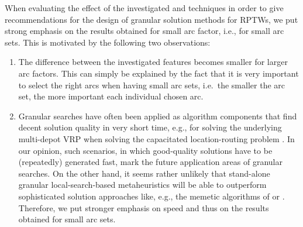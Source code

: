 \documentclass[11pt,a4paper,fleqn]{article}
\begin{document}
When evaluating the effect of the investigated \sms and techniques in order to give recommendations for the design of granular solution methods for RPTWs, we put strong emphasis on the results obtained for small arc factor, i.e., for small \reduced arc sets. This is motivated by the following two observations:
  \begin{enumerate}
  \item The difference between the investigated features becomes smaller for larger arc factors. This can simply be explained by the fact that it is very important to select the right arcs when having small arc sets, i.e.~the smaller the arc set, the more important each individual chosen arc.%
\item Granular searches have often been applied as algorithm components that find decent solution quality in very short time, e.g., for solving the underlying multi-depot VRP when solving the capacitated location-routing problem \citep[see][]{prins:07,escobar:13,escobar:14}. In our opinion, such scenarios, in which good-quality solutions have to be (repeatedly) generated fast, mark the future application areas of granular searches. On the other hand, it seems rather unlikely that stand-alone granular local-search-based metaheuristics will be able to outperform sophisticated solution approaches like, e.g., the memetic algorithms of \citet{nagata:10} or \citet{vidal:12}. Therefore, we put stronger emphasis on speed and thus on the results obtained for small \reduced arc sets. 
\end{enumerate}



\end{document}
